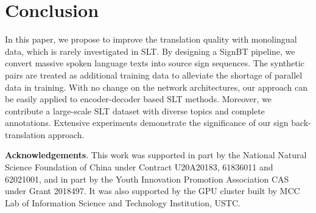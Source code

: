 \documentclass[final]{cvpr}
\begin{document}
\section{Conclusion} \label{sec:conclusion}

In this paper, we propose to improve the translation quality with monolingual data, 
which is rarely investigated in SLT. 
By designing a SignBT pipeline, we convert massive spoken language texts into source sign sequences. 
The synthetic pairs are treated as additional training data to alleviate the shortage of parallel data in training. 
With no change on the network architectures, our approach can be easily applied to encoder-decoder based SLT methods. 
Moreover, we contribute a large-scale SLT dataset with diverse topics and complete annotations. 
Extensive experiments demonstrate the significance of our sign back-translation approach.  



\footnotesize {\flushleft \bf Acknowledgements}. 
This work was supported in part by the National Natural Science Foundation of China under Contract U20A20183, 61836011 and 62021001, and in part by the Youth Innovation Promotion Association CAS under Grant 2018497. 
It was also supported by the GPU cluster built by MCC Lab of Information Science and Technology Institution, USTC.


{\small


}
\end{document}

